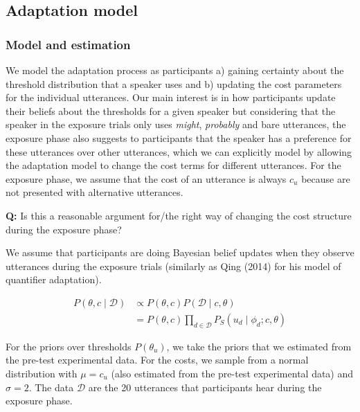 \documentclass[lucida,biblatex]{sp} %
\begin{document}
\subsection{Adaptation model}

\subsubsection{Model and estimation}

We model the adaptation process as participants  a) gaining certainty about the threshold distribution that a speaker uses and b) updating the cost parameters for the individual utterances. Our main interest is in how participants update their beliefs about the thresholds for a given speaker but considering that the speaker in the exposure trials only uses \textit{might}, \textit{probably} and bare utterances, the exposure phase also suggests to participants that the speaker has a preference for these utterances over other utterances, which we can explicitly model by allowing the adaptation model to change the cost terms for different utterances. For the exposure phase, we assume that the cost of an utterance is always $c_u$ because are not presented with alternative utterances.

\vspace{1em}

\textbf{Q:} Is this a reasonable argument for/the right way of changing the cost structure during the exposure phase?

\vspace{1em}


We assume that participants are doing Bayesian belief updates when they observe utterances during the exposure trials (similarly as Qing (2014) for his model of quantifier adaptation).

\begin{align*}
P(\theta, c \mid \mathscr{D}) &\propto P(\theta, c) P(\mathscr{D} \mid c, \theta)  \\
& = P(\theta, c) \prod_{d \in \mathscr{D}} P_S(u_d \mid \phi_d; c, \theta)
\end{align*}

For the priors over thresholds $P(\theta_u)$, we take the priors that we estimated from the pre-test experimental data. For the costs, we sample from a normal distribution with $\mu=c_u$ (also estimated from the pre-test experimental data) and $\sigma=2$. The data  $\mathscr{D}$ are the 20 utterances that participants hear during the exposure phase. 
\end{document}
